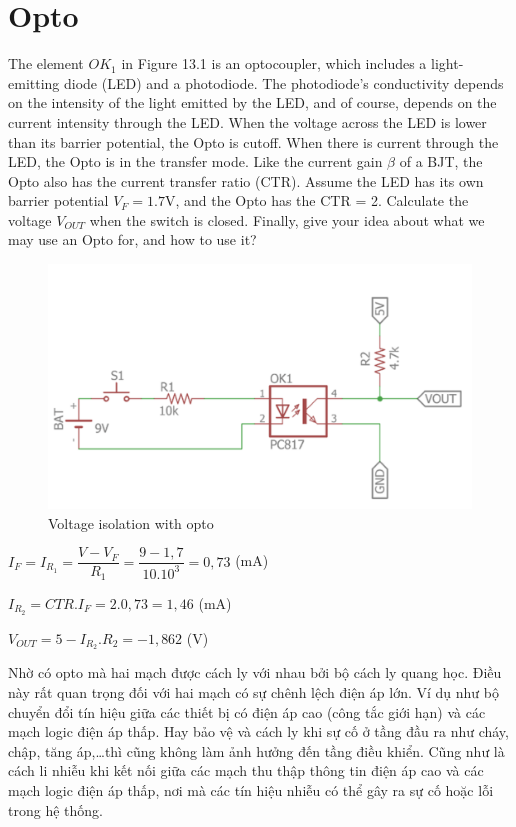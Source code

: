 \section{Opto}
The element \(OK_1\) in Figure 13.1 is an optocoupler, which includes a light-emitting diode
(LED) and a photodiode. The photodiode's conductivity depends on the intensity of the
light emitted by the LED, and of course, depends on the current intensity through the
LED. When the voltage across the LED is lower than its barrier potential, the Opto is cutoff. When there is current through the LED, the Opto is in the transfer mode. Like the
current gain \(\beta\) of a BJT, the Opto also has the current transfer ratio (CTR). Assume the LED
has its own barrier potential \(V_F = 1.7\)V, and the Opto has the CTR = 2. Calculate the voltage
\(V_{OUT}\) when the switch is closed. Finally, give your idea about what we may use an Opto
for, and how to use it?

\begin{figure}[ht]
    \centering
    \includegraphics[scale=0.3]{graphics/ex13/f1.png}
    \caption{Voltage isolation with opto}
\end{figure}

\(I_F = I_{R_1} = \dfrac{V - V_F}{R_1} = \dfrac{9 - 1,7}{10.10^3} = 0,73 \) (mA)

\(I_{R_2} = CTR.I_F = 2.0,73 = 1,46\) (mA)

\(V_{OUT} = 5 - I_{R_2}.R_2 = -1,862\) (V)

Nhờ có opto mà hai mạch được cách ly với nhau bởi bộ cách ly quang học. Điều này rất quan trọng đối với hai mạch có sự chênh lệch điện áp lớn. Ví dụ như bộ chuyển đổi tín hiệu giữa các thiết bị có điện áp cao (công tắc giới hạn) và các mạch logic điện áp thấp. 
Hay bảo vệ và cách ly khi sự cố ở tầng đầu ra như cháy, chập, tăng áp,…thì cũng không làm ảnh hưởng đến tầng điều khiển. Cũng như là cách li nhiễu khi kết nối giữa các mạch thu thập thông tin điện áp cao và các mạch logic điện áp thấp, nơi mà các tín hiệu nhiễu có thể gây ra sự cố hoặc lỗi trong hệ thống.
